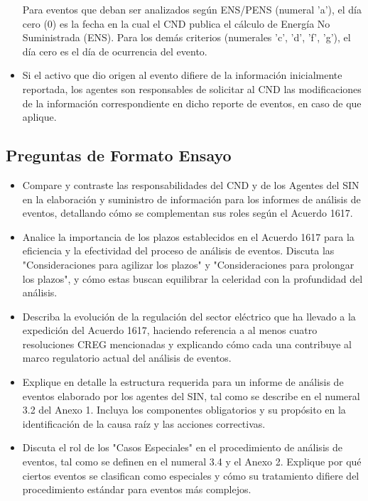 \documentclass[a5paper]{book}%
\begin{document}
\begin{itemize}
    Para eventos que deban ser analizados según ENS/PENS (numeral 'a'), el día cero (0) es la fecha en la cual el CND publica el cálculo de Energía No Suministrada (ENS). Para los demás criterios (numerales 'c', 'd', 'f', 'g'), el día cero es el día de ocurrencia del evento.
  \item Si el activo que dio origen al evento difiere de la información inicialmente reportada, los agentes son responsables de solicitar al CND las modificaciones de la información correspondiente en dicho reporte de eventos, en caso de que aplique.
    \end{itemize}

\subsection{Preguntas de Formato Ensayo}
\begin{itemize}
\item Compare y contraste las responsabilidades del CND y de los Agentes del SIN en la elaboración y suministro de información para los informes de análisis de eventos, detallando cómo se complementan sus roles según el Acuerdo 1617.
   
\item  Analice la importancia de los plazos establecidos en el Acuerdo 1617 para la eficiencia y la efectividad del proceso de análisis de eventos. Discuta las "Consideraciones para agilizar los plazos" y "Consideraciones para prolongar los plazos", y cómo estas buscan equilibrar la celeridad con la profundidad del análisis.
    
\item Describa la evolución de la regulación del sector eléctrico que ha llevado a la expedición del Acuerdo 1617, haciendo referencia a al menos cuatro resoluciones CREG mencionadas y explicando cómo cada una contribuye al marco regulatorio actual del análisis de eventos.
\item Explique en detalle la estructura requerida para un informe de análisis de eventos elaborado por los agentes del SIN, tal como se describe en el numeral 3.2 del Anexo 1. Incluya los componentes obligatorios y su propósito en la identificación de la causa raíz y las acciones correctivas.
\item Discuta el rol de los "Casos Especiales" en el procedimiento de análisis de eventos, tal como se definen en el numeral 3.4 y el Anexo 2. Explique por qué ciertos eventos se clasifican como especiales y cómo su tratamiento difiere del procedimiento estándar para eventos más complejos.
\end{itemize}
\end{document}
